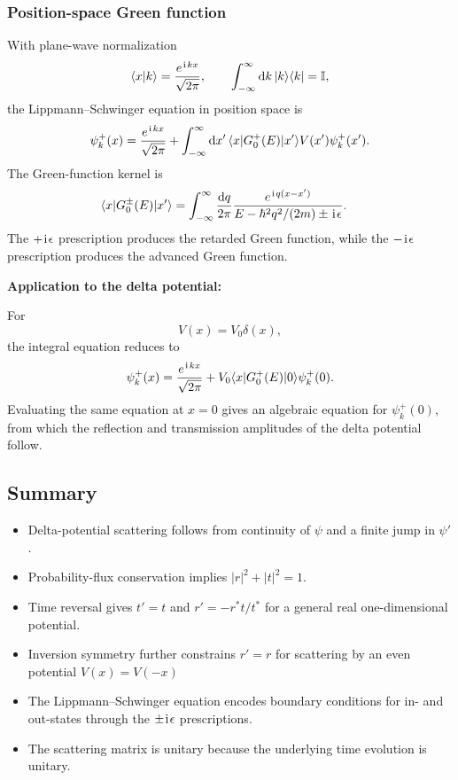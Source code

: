 \subsubsection{Position-space Green function}
With plane-wave normalization
\begin{equation}
 \langle{x|k}\rangle=\frac{e^{\hspace{1pt}\mathrm{i}\hspace{1pt} kx}}{\sqrt{2\pi}},
 \qquad
 \int_{-\infty}^{\infty}\mathrm{d} k\,|{k}\rangle\langle{k}|=\mathbb{I},
\end{equation}
the Lippmann--Schwinger equation in position space is
\begin{equation}
 \psi_k^+(x)=\frac{e^{\hspace{1pt}\mathrm{i}\hspace{1pt} kx}}{\sqrt{2\pi}}
 +\int_{-\infty}^{\infty}\mathrm{d} x'\,
 \langle{x}|G_0^+(E)|{x'}\rangle V(x')\psi_k^+(x').
\end{equation}
The Green-function kernel is
\begin{align}
 \langle{x}|G_0^\pm(E)|{x'}\rangle
 &=\int_{-\infty}^{\infty}\frac{\mathrm{d} q}{2\pi}
 \frac{e^{\hspace{1pt}\mathrm{i}\hspace{1pt} q(x-x')}}
 {E-\hbar^2q^2/(2m)\pm\hspace{1pt}\mathrm{i}\hspace{1pt}\epsilon}.
\end{align}
The $+\hspace{1pt}\mathrm{i}\hspace{1pt}\epsilon$ prescription produces the retarded Green
function, while the $-\hspace{1pt}\mathrm{i}\hspace{1pt}\epsilon$ prescription produces the advanced Green function.

\textbf{Application to the delta potential:}

For
\begin{equation}
 V(x)=V_0\delta(x),
\end{equation}
the integral equation reduces to
\begin{equation}
 \psi_k^+(x)=\frac{e^{\hspace{1pt}\mathrm{i}\hspace{1pt} kx}}{\sqrt{2\pi}}
 +V_0\langle{x}|G_0^+(E)|{0}\rangle\psi_k^+(0).
\end{equation}
Evaluating the same equation at $x=0$ gives an algebraic equation for
$\psi_k^+(0)$, from which the reflection and transmission amplitudes of the
delta potential follow.

\subsection{Summary}
\begin{itemize}
 \item Delta-potential scattering follows from continuity of $\psi$ and a
 finite jump in $\psi'$.
 \item Probability-flux conservation implies $|r|^2+|t|^2=1$.
 \item Time reversal gives $t'=t$ and
 $r'=-r^*t/t^*$ for a general real one-dimensional potential.
 \item Inversion symmetry further constrains $r'=r$ for scattering by an even potential $V(x)=V(-x)$
 \item The Lippmann--Schwinger equation encodes boundary
 conditions for in- and out-states through the $\pm\hspace{1pt}\mathrm{i}\hspace{1pt}\epsilon$ prescriptions.
 \item The scattering matrix is unitary because the underlying time evolution
 is unitary.
\end{itemize}

